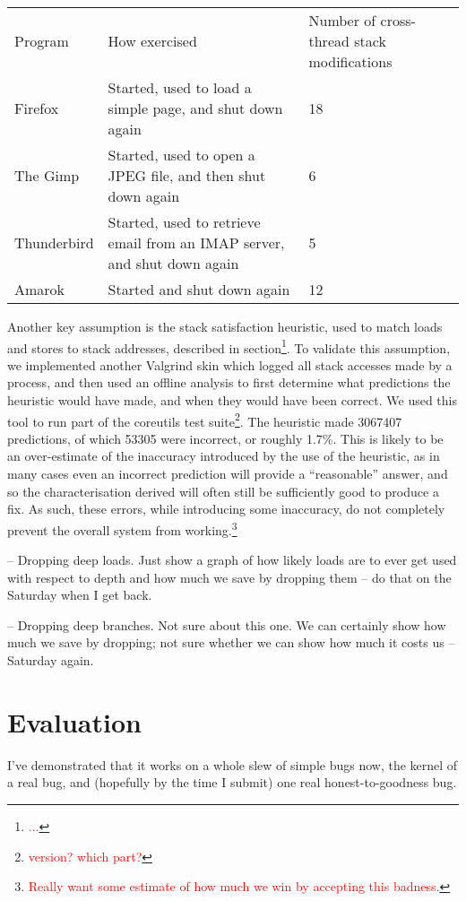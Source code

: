\documentclass[10pt,twocolumn,preprint,natbib,authoryear]{sigplanconf}
\newcommand{\editorial}[1]{\textcolor{red}{\footnote{\textcolor{red}{#1}}}}
\begin{document}
\begin{tabular}{lll}
Program & How exercised & Number of cross-thread stack modifications \\
Firefox & Started, used to load a simple page, and shut down again & 18 \\
The Gimp & Started, used to open a JPEG file, and then shut down again & 6 \\
Thunderbird & Started, used to retrieve email from an IMAP server, and shut down again & 5\\
Amarok & Started and shut down again & 12
\end{tabular}

Another key assumption is the stack satisfaction heuristic, used to
match loads and stores to stack addresses, described in
section\editorial{...}.  To validate this assumption, we implemented
another Valgrind skin which logged all stack accesses made by a
process, and then used an offline analysis to first determine what
predictions the heuristic would have made, and when they would have
been correct.  We used this tool to run part of the coreutils test
suite\editorial{version? which part?}.  The heuristic made 3067407
predictions, of which 53305 were incorrect, or roughly 1.7\%.  This is
likely to be an over-estimate of the inaccuracy introduced by the use
of the heuristic, as in many cases even an incorrect prediction will
provide a ``reasonable'' answer, and so the characterisation derived
will often still be sufficiently good to produce a fix.  As such,
these errors, while introducing some inaccuracy, do not completely
prevent the overall system from working.\editorial{Really want some
  estimate of how much we win by accepting this badness.}

-- Dropping deep loads.  Just show a graph of how likely loads are to
ever get used with respect to depth and how much we save by dropping
them -- do that on the Saturday when I get back.

-- Dropping deep branches.  Not sure about this one.  We can certainly
show how much we save by dropping; not sure whether we can show how
much it costs us -- Saturday again.

\section{Evaluation}

I've demonstrated that it works on a whole slew of simple bugs now,
the kernel of a real bug, and (hopefully by the time I submit) one
real honest-to-goodness bug.
\end{document}

